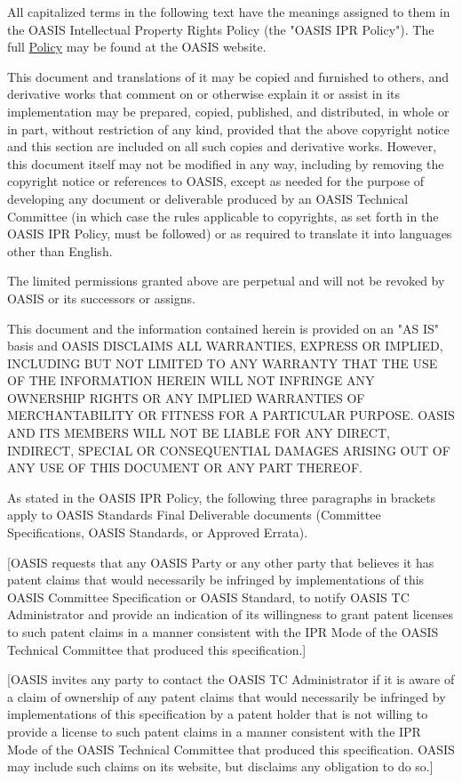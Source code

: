 \begin{titlepage}
All capitalized terms in the following text have the meanings assigned
to them in the OASIS Intellectual Property Rights Policy (the "OASIS
IPR Policy"). The full \href{https://www.oasis-open.org/policies-guidelines/ipr/}{Policy} may be found at the OASIS website.

This document and translations of it may be copied and furnished to
others, and derivative works that comment on or otherwise explain it
or assist in its implementation may be prepared, copied, published,
and distributed, in whole or in part, without restriction of any kind,
provided that the above copyright notice and this section are included
on all such copies and derivative works. However, this document itself
may not be modified in any way, including by removing the copyright
notice or references to OASIS, except as needed for the purpose of
developing any document or deliverable produced by an OASIS Technical
Committee (in which case the rules applicable to copyrights, as set
forth in the OASIS IPR Policy, must be followed) or as required to
translate it into languages other than English.

The limited permissions granted above are perpetual and will not be
revoked by OASIS or its successors or assigns.

This document and the information contained herein is provided on an
"AS IS" basis and OASIS DISCLAIMS ALL WARRANTIES, EXPRESS OR IMPLIED,
INCLUDING BUT NOT LIMITED TO ANY WARRANTY THAT THE USE OF THE
INFORMATION HEREIN WILL NOT INFRINGE ANY OWNERSHIP RIGHTS OR ANY
IMPLIED WARRANTIES OF MERCHANTABILITY OR FITNESS FOR A PARTICULAR
PURPOSE. OASIS AND ITS MEMBERS WILL NOT BE LIABLE FOR ANY DIRECT,
INDIRECT, SPECIAL OR CONSEQUENTIAL DAMAGES ARISING OUT OF ANY USE
OF THIS DOCUMENT OR ANY PART THEREOF.

As stated in the OASIS IPR Policy, the following three paragraphs
in brackets apply to OASIS Standards Final Deliverable documents
(Committee Specifications, OASIS Standards, or Approved Errata).

[OASIS requests that any OASIS Party or any other party that believes
it has patent claims that would necessarily be infringed by
implementations of this OASIS Committee Specification or OASIS
Standard, to notify OASIS TC Administrator and provide an indication
of its willingness to grant patent licenses to such patent claims in a
manner consistent with the IPR Mode of the OASIS Technical Committee
that produced this specification.]

[OASIS invites any party to contact the OASIS TC Administrator if it is
aware of a claim of ownership of any patent claims that would
necessarily be infringed by implementations of this specification by a
patent holder that is not willing to provide a license to such patent
claims in a manner consistent with the IPR Mode of the OASIS Technical
Committee that produced this specification. OASIS may include such
claims on its website, but disclaims any obligation to do so.]


\end{titlepage}
